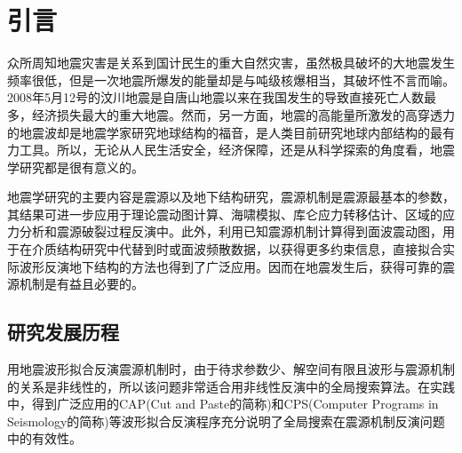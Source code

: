 

\chapter{引言}
\label{cha:intro}

众所周知地震灾害是关系到国计民生的重大自然灾害，虽然极具破坏的大地震发生频率很低，但是一次地震所爆发的能量却是与吨级核爆相当\citep{Stein2003}，其破坏性不言而喻。2008年5月12号的汶川地震是自唐山地震以来在我国发生的导致直接死亡人数最多，经济损失最大的重大地震。然而，另一方面，地震的高能量所激发的高穿透力的地震波却是地震学家研究地球结构的福音，是人类目前研究地球内部结构的最有力工具。所以，无论从人民生活安全，经济保障，还是从科学探索的角度看，地震学研究都是很有意义的。

地震学研究的主要内容是震源以及地下结构研究，震源机制是震源最基本的参数，其结果可进一步应用于理论震动图计算\citep{Wald2005}、海啸模拟\citep{Satake2007}、库仑应力转移估计\citep{King2007}、区域的应力分析和震源破裂过程反演中\citep{Kilb2001}。此外，利用已知震源机制计算得到面波震动图，用于在介质结构研究中代替到时或面波频散数据，以获得更多约束信息，直接拟合实际波形反演地下结构的方法也得到了广泛应用\citep{Nolet1990,Manaman2011,Friederich2003,Zielhuis1994,Cao2001,Lee1997}。因而在地震发生后，获得可靠的震源机制是有益且必要的。



\section{研究发展历程}

用地震波形拟合反演震源机制时，由于待求参数少、解空间有限且波形与震源机制的关系是非线性的，所以该问题非常适合用非线性反演中的全局搜索算法。在实践中，得到广泛应用的CAP(Cut and Paste的简称)\citep{Zhao1994,Zhu1996,Tan2006}和CPS(Computer Programs in Seismology的简称)\citep{Herrmann1989}等波形拟合反演程序充分说明了全局搜索在震源机制反演问题中的有效性。
